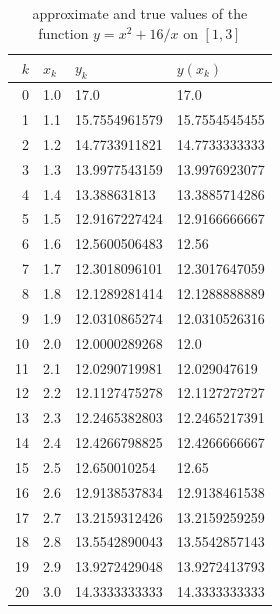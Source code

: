 \documentclass[a4paper,11pt]{book}
\begin{document}
\begin{table}
  \centering\small
  \begin{tabular}{|r|ll|l|}
    \hline
    $k$ & $x_k$ & $y_k$ & $y(x_k)$\\\hline
    0 & 1.0 & 17.0 & 17.0\\
    1 & 1.1 & 15.7554961579 & 15.7554545455\\
    2 & 1.2 & 14.7733911821 & 14.7733333333\\
    3 & 1.3 & 13.9977543159 & 13.9976923077\\
    4 & 1.4 & 13.388631813 & 13.3885714286\\
    5 & 1.5 & 12.9167227424 & 12.9166666667\\
    6 & 1.6 & 12.5600506483 & 12.56\\
    7 & 1.7 & 12.3018096101 & 12.3017647059\\
    8 & 1.8 & 12.1289281414 & 12.1288888889\\
    9 & 1.9 & 12.0310865274 & 12.0310526316\\
    10 & 2.0 & 12.0000289268 & 12.0\\
    11 & 2.1 & 12.0290719981 & 12.029047619\\
    12 & 2.2 & 12.1127475278 & 12.1127272727\\
    13 & 2.3 & 12.2465382803 & 12.2465217391\\
    14 & 2.4 & 12.4266798825 & 12.4266666667\\
    15 & 2.5 & 12.650010254 & 12.65\\
    16 & 2.6 & 12.9138537834 & 12.9138461538\\
    17 & 2.7 & 13.2159312426 & 13.2159259259\\
    18 & 2.8 & 13.5542890043 & 13.5542857143\\
    19 & 2.9 & 13.9272429048 & 13.9272413793\\
    20 & 3.0 & 14.3333333333 & 14.3333333333\\\hline
  \end{tabular}
  \caption{approximate and true values of the function $y=x^2+16/x$ on $[1,3]$\label{tab:bvp}}
\end{table}
\end{document}
